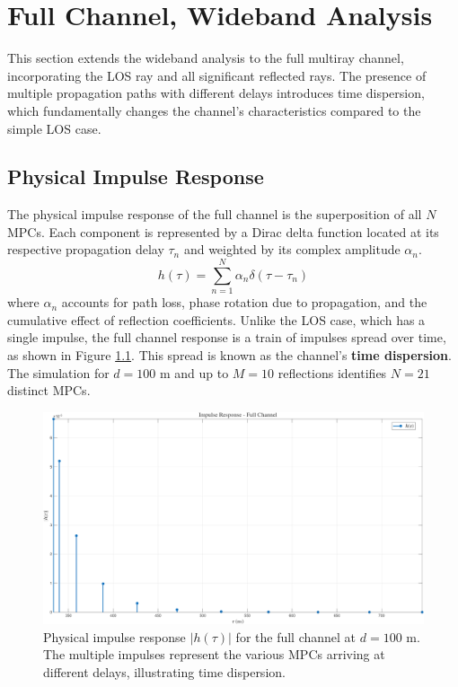 \chapter{Full Channel, Wideband Analysis}
\label{chap:full_wide}

This section extends the wideband analysis to the full multiray channel, incorporating the  LOS ray and all significant reflected rays. The presence of multiple propagation paths with different delays introduces time dispersion, which fundamentally changes the channel's characteristics compared to the simple LOS case.

\section{Physical Impulse Response}
The physical impulse response of the full channel is the superposition of all $N$ MPCs. Each component is represented by a Dirac delta function located at its respective propagation delay $\tau_n$ and weighted by its complex amplitude $\alpha_n$.
\begin{equation}
	h(\tau) = \sum_{n=1}^{N} \alpha_n \delta(\tau - \tau_n)
\end{equation}
where $\alpha_n$ accounts for path loss, phase rotation due to propagation, and the cumulative effect of reflection coefficients. Unlike the LOS case, which has a single impulse, the full channel response is a train of impulses spread over time, as shown in Figure \ref{fig:h_tau_full}. This spread is known as the channel's \textbf{time dispersion}. The simulation for $d=100$ m and up to $M=10$ reflections identifies $N=21$ distinct MPCs.

\begin{figure}[h!]
	\centering
	\includegraphics[width=\linewidth]{"content/4-images/h-tau - Full Channel.png"}
	\caption{Physical impulse response $|h(\tau)|$ for the full channel at $d=100$ m. The multiple impulses represent the various MPCs arriving at different delays, illustrating time dispersion.}
	\label{fig:h_tau_full}
\end{figure}

